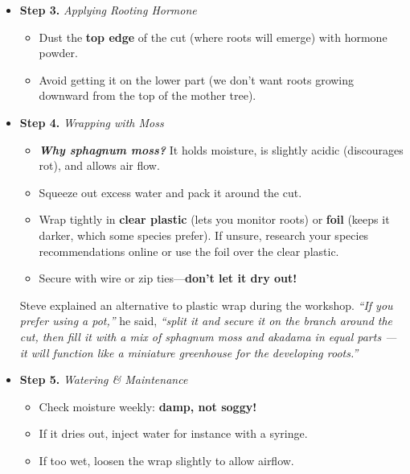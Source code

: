 \begin{itemize}
    \item \textbf{Step 3.} \textit{Applying Rooting Hormone}
    \begin{itemize}
        \item Dust the \textbf{top edge} of the cut (where roots will emerge) with hormone powder.
        
        \item Avoid getting it on the lower part (we don't want roots growing downward from the top of the mother tree).
    \end{itemize}

    \item \textbf{Step 4.} \textit{Wrapping with Moss}
    \begin{itemize}
        \item \textbf{\textit{Why sphagnum moss?}} It holds moisture, is slightly acidic (discourages rot), and allows air flow. 
        
        \item Squeeze out excess water and pack it around the cut. 

        \item Wrap tightly in \textbf{clear plastic} (lets you monitor roots) or \textbf{foil} (keeps it darker, which some species prefer). If unsure, research your species recommendations online or use the foil over the clear plastic.

        \item Secure with wire or zip ties---\textbf{don't let it dry out!}
    \end{itemize}
    Steve explained an alternative to plastic wrap during the workshop. \textit{``If you prefer using a pot,''} he said, \textit{``split it and secure it on the branch around the cut, then fill it with a mix of sphagnum moss and akadama in equal parts --- it will function like a miniature greenhouse for the developing roots.''}

    \item \textbf{Step 5.} \textit{Watering \& Maintenance}
    \begin{itemize}
        \item Check moisture weekly: \textbf{damp, not soggy!} 

        \item If it dries out, inject water for instance with a syringe.

        \item If too wet, loosen the wrap slightly to allow airflow.
    \end{itemize}
\end{itemize}

